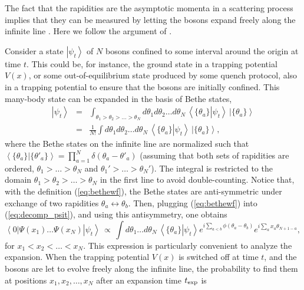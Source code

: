 \documentclass[onecolumn,amsfonts,showpacs,superscriptaddress]{revtex4-1}
\begin{document}
The fact that the rapidities are the asymptotic momenta in a scattering process implies that they can be measured by letting the bosons expand freely along the infinite line \citep{rigol2005fermionization,minguzzi2005exact,buljan2008fermi,jukic2008free,del2008fermionization,bolech2012long,campbell_sudden_2015,mei2016unveiling,caux2019hydrodynamics,wilson_observation_2020,malvania2020generalized}. Here we follow the argument of \citep{campbell_sudden_2015}. 

Consider a state $\left| \psi_t \right>$ of $N$ bosons confined to some interval around the origin at time $t$. This could be, for instance, the ground state in a trapping potential $V(x)$, or some out-of-equilibrium state produced by some quench protocol, also in a trapping potential to ensure that the bosons are initially confined. This many-body state can be expanded in the basis of Bethe states,
\begin{eqnarray}
    \label{eq:decomp_psit}
\nonumber    \left| \psi_t \right> & = &  \int_{\theta_1> \theta_2 > \dots > \theta_N} d\theta_1 d\theta_2 \dots d\theta_N \, \left< \{ \theta_a\} \left| \psi_t \right> \right.  \, \left| \{ \theta_a\} \right> \\
    & = &  \frac{1}{N!} \int  d\theta_1 d\theta_2 \dots d\theta_N \, \left< \{ \theta_a\} \left| \psi_t \right> \right.  \, \left| \{ \theta_a\} \right>,
\end{eqnarray}
where the Bethe states on the infinite line are normalized such that $\left< \{ \theta_a\} \left| \{ \theta'_a\} \right> \right. = \prod_{a=1}^N \delta(\theta_a - \theta'_a) $ (assuming that both sets of rapidities are ordered, $\theta_1 > \dots> \theta_N$ and $\theta_1' > \dots >\theta_N'$). The integral is restricted to the domain $\theta_1> \theta_2 > \dots > \theta_N$ in the first line to avoid double-counting. Notice that, with the definition (\ref{eq:bethewf}), the Bethe states are anti-symmetric under exchange of two rapidities $\theta_a \leftrightarrow \theta_b$. Then, plugging (\ref{eq:bethewf}) into (\ref{eq:decomp_psit}), and using this antisymmetry, one obtains~\citep{campbell_sudden_2015}
\begin{equation}
    \left< 0 \right| \Psi(x_1) \dots \Psi(x_N) \left| \psi_t \right> \, \propto \,  \int d\theta_1 \dots d\theta_N  \, \left< \{ \theta_a\} \left| \psi_t \right>\right. e^{i \sum_{a<b} \phi( \theta_a - \theta_b) }  e^{i \sum_a x_a \theta_{N+1-a} } ,
\end{equation}
for $x_1 < x_2 < \dots < x_N$. This expression is particularly convenient to analyze the expansion. When the trapping potential $V(x)$ is switched off at time $t$, and the bosons are let to evolve freely along the infinite line, the probability to find them at positions $x_1, x_2, \dots , x_N$ after an expansion time $t_{\rm exp}$ is
\end{document}
